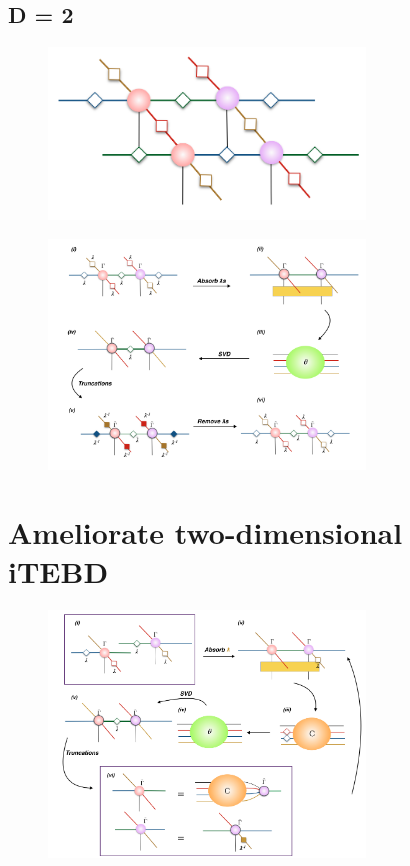 \subsection{D = 2}
\label{2ditebd}
	\begin{figure}[ht]
	\centering
	\includegraphics[width=0.75\textwidth]{figures/fig314.png}
	\caption[tmp]{}
	\label{fig314}
	\end{figure}

	\begin{figure}[ht]
	\centering
	\includegraphics[width=0.75\textwidth]{figures/fig315.png}
	\caption[tmp]{}
	\label{fig315}
	\end{figure}

\section{Ameliorate two-dimensional iTEBD}
\label{2dhastin}

	\begin{figure}[ht]
	\centering
	\includegraphics[width=0.75\textwidth]{figures/fig316.png}
	\caption[tmp]{}
	\label{fig316}
	\end{figure}

